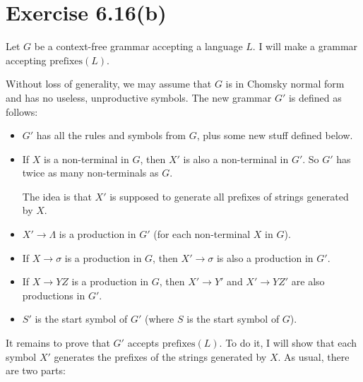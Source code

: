 \documentclass[12pt]{article}
\newcommand{\prefixes}{\mathrm{prefixes}}
\begin{document}
\section{Exercise 6.16(b)}
  Let $G$ be a context-free grammar accepting a language $L$. I will make a grammar accepting $\prefixes(L)$.

  Without loss of generality, we may assume that $G$ is in Chomsky normal form and has no useless, unproductive symbols. The new grammar $G'$ is defined as follows:
  \begin{itemize}
    \item
      $G'$ has all the rules and symbols from $G$, plus some new stuff defined below.
    \item
      If $X$ is a non-terminal in $G$, then $X'$ is also a non-terminal in $G'$. So $G'$ has twice as many non-terminals as $G$.

      The idea is that $X'$ is supposed to generate all prefixes of strings generated by $X$.
    \item
      $X'\to\Lambda$ is a production in $G'$ (for each non-terminal $X$ in $G$).
    \item
      If $X\to\sigma$ is a production in $G$, then $X'\to\sigma$ is also a production in $G'$.
    \item
      If $X\to YZ$ is a production in $G$, then $X'\to Y'$ and $X'\to YZ'$ are also productions in $G'$.
    \item
      $S'$ is the start symbol of $G'$ (where $S$ is the start symbol of $G$).
  \end{itemize}
  It remains to prove that $G'$ accepts $\prefixes(L)$. To do it, I will show that each symbol $X'$ generates the prefixes of the strings generated by $X$. As usual, there are two parts:
\end{document}

